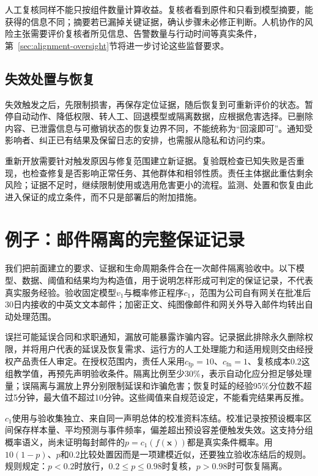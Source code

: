 人工复核同样不能只按组件数量计算收益。复核者看到原件和只看到模型摘要，能获得的信息不同；摘要若已漏掉关键证据，确认步骤未必修正判断。人机协作的风险主张需要评价复核者所见信息、告警数量与行动时间等真实条件，第~\ref{sec:alignment-oversight}节将进一步讨论这些监督要求。

\subsection{失效处置与恢复}

失效触发之后，先限制损害，再保存定位证据，随后恢复到可重新评价的状态。暂停自动动作、降低权限、转人工、回退模型或隔离数据，应根据危害选择。已删除内容、已泄露信息与可撤销状态的恢复边界不同，不能统称为“回滚即可”。通知受影响者、纠正已有结果及保留日志的安排，也需服从隐私和访问约束。

重新开放需要针对触发原因与修复范围建立新证据。复验既检查已知失败是否重现，也检查修复是否影响正常任务、其他群体和相邻性质。责任主体据此重估剩余风险；证据不足时，继续限制使用或选用危害更小的流程。监测、处置和恢复由此进入保证的成立条件，而不只是部署后的附加措施。

\section{例子：邮件隔离的完整保证记录}
\label{sec:trust-mail-assurance}

我们把前面建立的要求、证据和生命周期条件合在一次邮件隔离验收中。以下模型、数据、阈值和结果均为构造值，用于说明怎样形成可判定的保证记录，不代表真实服务经验。验收固定模型$v_1$与概率修正程序$c_1$，范围为公司自有网关在批准后30日内接收的中英文文本邮件；加密正文、纯图像邮件和网关外导入邮件均转出自动处理范围。

误拦可能延误合同和求职通知，漏放可能暴露诈骗内容。记录据此排除永久删除权限，并将用户代表的延误及恢复需求、运行方的人工处理能力和适用规则交由经授权产品责任人审定。在授权范围内，责任人采用$c_{\mathrm{fp}}=10$、$c_{\mathrm{fn}}=1$、复核成本$0.2$这组教学值，再预先声明验收条件。隔离比例至少30\%，表示自动化应分担足够处理量；误隔离与漏放上界分别限制延误和诈骗危害；恢复时延的经验95\%分位数不超过5分钟，最大值不超过10分钟。这些阈值来自规范设定，不能看完结果再反推。

$c_1$使用与验收集独立、来自同一声明总体的校准资料冻结。校准记录按预设概率区间保存样本量、平均预测与事件频率，偏差超出预设容差便触发失效。这支持分组概率语义，尚未证明每封邮件的$p=c_1(f(\bm x))$都是真实条件概率。用$10(1-p)$、$p$和$0.2$比较处置因而是一项建模近似，还要独立验收冻结后的规则。规则规定：$p<0.2$时放行，$0.2\leq p\leq0.98$时复核，$p>0.98$时可恢复隔离。

